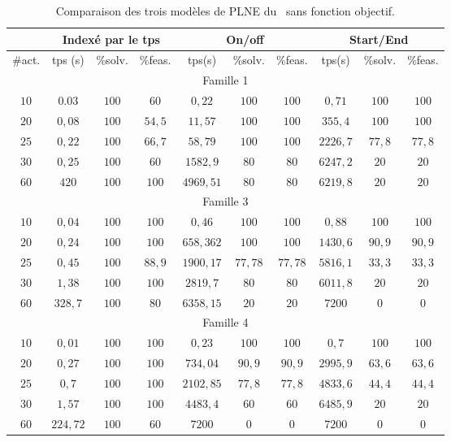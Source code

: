 \begin{table}[ht] \centering
  \begin{tabular}{|c|ccc|ccc|ccc|}
\hline & \multicolumn{3}{c}{Indexé par le tps} & \multicolumn{3}{|c}{On/off} & \multicolumn{3}{|c|}{Start/End}\\ \hline
\#act. & tps (s) & \%solv. &
\%feas. & tps(s) & \%solv. &
\%feas. & tps(s) & \%solv. &
\%feas. \\ \hline 
    \multicolumn{10}{|c|}{Famille 1}\\
    \hline
   $ 10	$&$	0.03	$&$	100	$& $60$& $0,22$ & $100$ & $100$&$	0,71	$&$	100	$&$	100$	\\
   $ 20	$&$	0,08	$&$	100	$&$	54,5	$& $11,57$ & $100$ & $100$&$	355,4	$&$	100	$&$	100$	\\
    $25	$&$	0,22	$&$	100	$&$	66,7	$&$58,79$ & $100$ & $100	$&$	2226,7	$&$	77,8	$&$	77,8$	\\
    $30	$&$	0,25	$&$	100	$&$	60	$& $1582,9$ &
                                                                     $80$ & $80 $&$	6247,2	$&$	20	$&$	20$	\\
    $60	$&$	420	$&$	100	$&$	100	$&$4969,51$ & $80$ & $80	$&$	6219,8	$&$	20	$&$	20$	\\
    \hline 
    \multicolumn{10}{|c|}{Famille 3}\\
    \hline
   $ 10	$&$	0,04	$&$	100	$&$	100	$&$0,46$ & $100$ & $100$&$0,88	$&$	100	$&$	100$	\\
   $ 20	$&$	0,24	$&$	100	$&$	100	$&$658,362$ & $100$ & $100$&$	1430,6	$&$	90,9	$&$	90,9$	\\
   $ 25	$&$	0,45	$&$	100	$&$	88,9	$&$	1900,17$ & $77,78$ & $77,78	$&$	5816,1	$&$	33,3	$&$	33,3$	\\
   $ 30	$&$	1,38	$&$	100	$&$	100	$&$	2819,7$ & $80$ & $80$&$	6011,8	$&$	20	$&$	20$	\\
  $  60	$&$	328,7	$&$	100	$&$	80	$&$6358,15$ & $20$ & $20$&$	7200	$&$	0	$&$	0$	\\
    \hline 
    \multicolumn{10}{|c|}{Famille 4}\\
    \hline
   $ 10	$&$	0,01	$&$	100	$&$	100	$&$	0,23	$&$	100	$&$	100	$&$	0,7	$&$	100	$&$	100$	\\
  $  20	$&$	0,27	$&$	100	$&$	100	$&$	734,04	$&$	90,9	$&$	90,9	$&$	2995,9	$&$	63,6	$&$	63,6$	\\
   $ 25	$&$	0,7	$&$	100	$&$	100	$&$	2102,85	$&$	77,8	$&$	77,8	$&$	4833,6	$&$	44,4	$&$	44,4$	\\
   $ 30	$&$	1,57	$&$	100	$&$	100	$&$	4483,4	$&$	60	$&$	60	$&$	6485,9	$&$	20	$&$	20$	\\
   $ 60	$&$	224,72	$&$	100	$&$	60	$&$	7200	$&$	0	$&$	0	$&$	7200	$&$	0	$&$	0$	\\
    \hline
  \end{tabular}
  \caption{Comparaison des trois modèles de PLNE du \CECSP~sans
    fonction objectif.}
  \label{MIPresult}
\end{table} 

